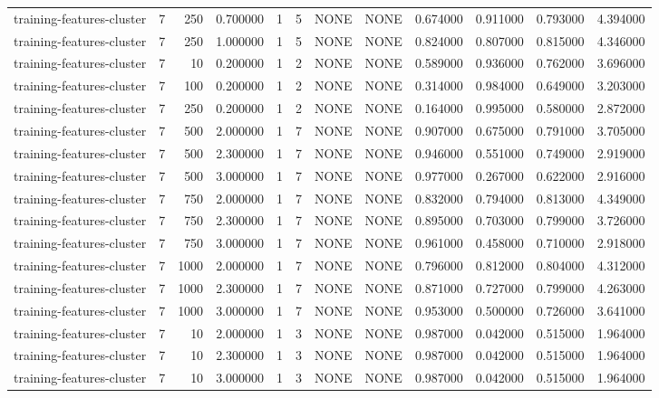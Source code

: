 \begin{tabular}{lrrrllllrrrr}
training-features-cluster & 7 & 250 & 0.700000 & 1 & 5 & NONE & NONE & 0.674000 & 0.911000 & 0.793000 & 4.394000 \\
training-features-cluster & 7 & 250 & 1.000000 & 1 & 5 & NONE & NONE & 0.824000 & 0.807000 & 0.815000 & 4.346000 \\
training-features-cluster & 7 & 10 & 0.200000 & 1 & 2 & NONE & NONE & 0.589000 & 0.936000 & 0.762000 & 3.696000 \\
training-features-cluster & 7 & 100 & 0.200000 & 1 & 2 & NONE & NONE & 0.314000 & 0.984000 & 0.649000 & 3.203000 \\
training-features-cluster & 7 & 250 & 0.200000 & 1 & 2 & NONE & NONE & 0.164000 & 0.995000 & 0.580000 & 2.872000 \\
training-features-cluster & 7 & 500 & 2.000000 & 1 & 7 & NONE & NONE & 0.907000 & 0.675000 & 0.791000 & 3.705000 \\
training-features-cluster & 7 & 500 & 2.300000 & 1 & 7 & NONE & NONE & 0.946000 & 0.551000 & 0.749000 & 2.919000 \\
training-features-cluster & 7 & 500 & 3.000000 & 1 & 7 & NONE & NONE & 0.977000 & 0.267000 & 0.622000 & 2.916000 \\
training-features-cluster & 7 & 750 & 2.000000 & 1 & 7 & NONE & NONE & 0.832000 & 0.794000 & 0.813000 & 4.349000 \\
training-features-cluster & 7 & 750 & 2.300000 & 1 & 7 & NONE & NONE & 0.895000 & 0.703000 & 0.799000 & 3.726000 \\
training-features-cluster & 7 & 750 & 3.000000 & 1 & 7 & NONE & NONE & 0.961000 & 0.458000 & 0.710000 & 2.918000 \\
training-features-cluster & 7 & 1000 & 2.000000 & 1 & 7 & NONE & NONE & 0.796000 & 0.812000 & 0.804000 & 4.312000 \\
training-features-cluster & 7 & 1000 & 2.300000 & 1 & 7 & NONE & NONE & 0.871000 & 0.727000 & 0.799000 & 4.263000 \\
training-features-cluster & 7 & 1000 & 3.000000 & 1 & 7 & NONE & NONE & 0.953000 & 0.500000 & 0.726000 & 3.641000 \\
training-features-cluster & 7 & 10 & 2.000000 & 1 & 3 & NONE & NONE & 0.987000 & 0.042000 & 0.515000 & 1.964000 \\
training-features-cluster & 7 & 10 & 2.300000 & 1 & 3 & NONE & NONE & 0.987000 & 0.042000 & 0.515000 & 1.964000 \\
training-features-cluster & 7 & 10 & 3.000000 & 1 & 3 & NONE & NONE & 0.987000 & 0.042000 & 0.515000 & 1.964000 \\

\end{tabular}
